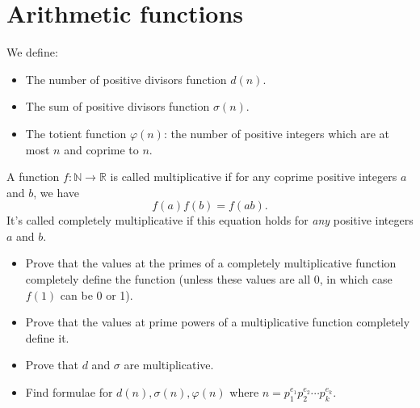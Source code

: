 \documentclass{article}
\begin{document}
\section{Arithmetic functions}
  We define:
  \begin{itemize}
    \item The number of positive divisors function $d(n)$.
    \item The sum of positive divisors function $\sigma(n)$.
    \item The totient function $\varphi(n)$: the number of positive integers
      which are at most $n$ and coprime to $n$.
  \end{itemize}
  A function $f:\mathbb N\to\mathbb R$ is called multiplicative if for any
  coprime positive integers $a$ and $b$, we have
  \[f(a)f(b)=f(ab).\]
  It's called completely multiplicative if this equation holds for \emph{any}
  positive integers $a$ and $b$.
  \begin{itemize}
    \item Prove that the values at the primes of a completely multiplicative
      function completely define the function (unless these values are all 0, in
      which case $f(1)$ can be 0 or 1).
    \item Prove that the values at prime powers of a multiplicative function
      completely define it. 
    \item Prove that $d$ and $\sigma$ are multiplicative.
    \item
      Find formulae for $d(n),\sigma(n),\varphi(n)$ where
      $n=p_1^{e_1}p_2^{e_2}\cdots p_k^{e_k}$.
  \end{itemize}
\end{document}
